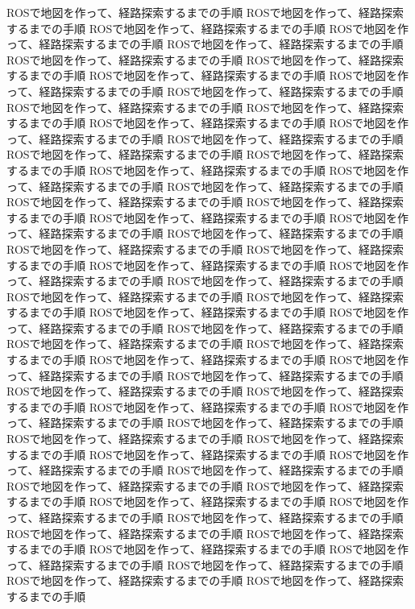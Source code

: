 ROSで地図を作って、経路探索するまでの手順
ROSで地図を作って、経路探索するまでの手順
ROSで地図を作って、経路探索するまでの手順
ROSで地図を作って、経路探索するまでの手順
ROSで地図を作って、経路探索するまでの手順
ROSで地図を作って、経路探索するまでの手順
ROSで地図を作って、経路探索するまでの手順
ROSで地図を作って、経路探索するまでの手順
ROSで地図を作って、経路探索するまでの手順
ROSで地図を作って、経路探索するまでの手順
ROSで地図を作って、経路探索するまでの手順
ROSで地図を作って、経路探索するまでの手順
ROSで地図を作って、経路探索するまでの手順
ROSで地図を作って、経路探索するまでの手順
ROSで地図を作って、経路探索するまでの手順
ROSで地図を作って、経路探索するまでの手順
ROSで地図を作って、経路探索するまでの手順
ROSで地図を作って、経路探索するまでの手順
ROSで地図を作って、経路探索するまでの手順
ROSで地図を作って、経路探索するまでの手順
ROSで地図を作って、経路探索するまでの手順
ROSで地図を作って、経路探索するまでの手順
ROSで地図を作って、経路探索するまでの手順
ROSで地図を作って、経路探索するまでの手順
ROSで地図を作って、経路探索するまでの手順
ROSで地図を作って、経路探索するまでの手順
ROSで地図を作って、経路探索するまでの手順
ROSで地図を作って、経路探索するまでの手順
ROSで地図を作って、経路探索するまでの手順
ROSで地図を作って、経路探索するまでの手順
ROSで地図を作って、経路探索するまでの手順
ROSで地図を作って、経路探索するまでの手順
ROSで地図を作って、経路探索するまでの手順
ROSで地図を作って、経路探索するまでの手順
ROSで地図を作って、経路探索するまでの手順
ROSで地図を作って、経路探索するまでの手順
ROSで地図を作って、経路探索するまでの手順
ROSで地図を作って、経路探索するまでの手順
ROSで地図を作って、経路探索するまでの手順
ROSで地図を作って、経路探索するまでの手順
ROSで地図を作って、経路探索するまでの手順
ROSで地図を作って、経路探索するまでの手順
ROSで地図を作って、経路探索するまでの手順
ROSで地図を作って、経路探索するまでの手順
ROSで地図を作って、経路探索するまでの手順
ROSで地図を作って、経路探索するまでの手順
ROSで地図を作って、経路探索するまでの手順
ROSで地図を作って、経路探索するまでの手順
ROSで地図を作って、経路探索するまでの手順
ROSで地図を作って、経路探索するまでの手順
ROSで地図を作って、経路探索するまでの手順
ROSで地図を作って、経路探索するまでの手順
ROSで地図を作って、経路探索するまでの手順
ROSで地図を作って、経路探索するまでの手順
ROSで地図を作って、経路探索するまでの手順
ROSで地図を作って、経路探索するまでの手順
ROSで地図を作って、経路探索するまでの手順
ROSで地図を作って、経路探索するまでの手順
ROSで地図を作って、経路探索するまでの手順
ROSで地図を作って、経路探索するまでの手順
ROSで地図を作って、経路探索するまでの手順
ROSで地図を作って、経路探索するまでの手順
